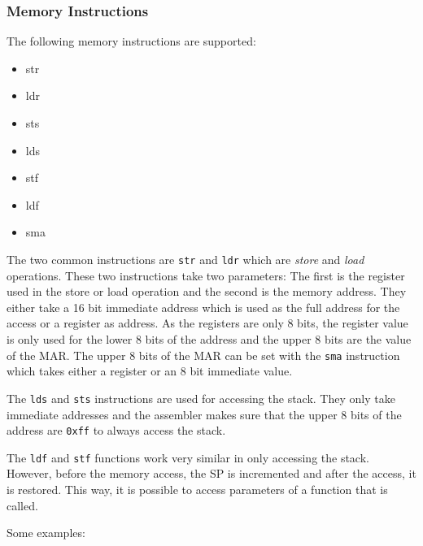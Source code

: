 \subsubsection{Memory Instructions}\label{sec:memInstr}
The following memory instructions are supported:
\begin{multicols}{4}
  \begin{itemize}
    \item str
    \item ldr
    \item sts
    \item lds
    \item stf
    \item ldf
    \item sma
  \end{itemize}
\end{multicols}

The two common instructions are \texttt{str} and \texttt{ldr} which are \emph{store} and \emph{load} operations.
These two instructions take two parameters:
The first is the register used in the store or load operation and the second is the memory address.
They either take a 16 bit immediate address which is used as the full address for the access or a register as address.
As the registers are only 8 bits, the register value is only used for the lower 8 bits of the address and the upper 8 bits are the value of the \gls{MAR}.
The upper 8 bits of the \gls{MAR} can be set with the \texttt{sma} instruction which takes either a register or an 8 bit immediate value.

The \texttt{lds} and \texttt{sts} instructions are used for accessing the stack.
They only take immediate addresses and the assembler makes sure that the upper 8 bits of the address are \texttt{0xff} to always access the stack.

The \texttt{ldf} and \texttt{stf} functions work very similar in only accessing the stack.
However, before the memory access, the \gls{SP} is incremented and after the access, it is restored.
This way, it is possible to access parameters of a function that is called.

Some examples:

